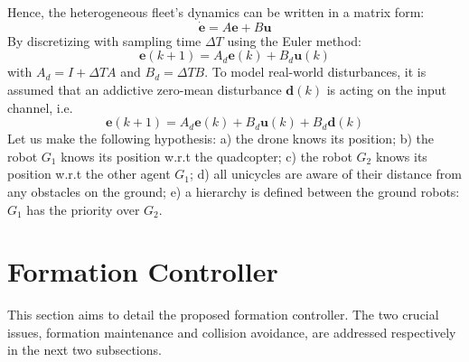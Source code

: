\documentclass{ifacconf}
\begin{document}
Hence, the heterogeneous fleet's dynamics can be written in a matrix form:
\begin{equation}
    \dot{\boldsymbol{e}} = A \boldsymbol{e} + B \boldsymbol{u}
\end{equation}
By discretizing with sampling time $\Delta T$ using the Euler method:
\begin{equation}
    \boldsymbol{e}(k+1) = A_d \boldsymbol{e}(k) + B_d \boldsymbol{u}(k) 
    \label{eq:airground-fleet-z}
\end{equation}
with $A_d = I + \Delta T A $ and $B_d = \Delta T B$.
To model real-world disturbances, it is assumed 
that an addictive zero-mean disturbance $\boldsymbol{d}(k)$
is acting on the input channel, i.e.
\begin{equation}
    \boldsymbol{e}(k+1) = A_d \boldsymbol{e}(k) + B_d \boldsymbol{u}(k) + B_d \boldsymbol{d}(k)
    \label{eq:airground-fleet-z}
\end{equation}
Let us make the following hypothesis: 
a) the drone knows its position;
b) the robot $G_1$ knows its position w.r.t the quadcopter;
c) the robot $G_2$ knows its position w.r.t the other agent $G_1$;
d) all unicycles are aware of their distance from any obstacles on the ground;
e) a hierarchy is defined between the ground robots: $G_1$ has the priority over $G_2$.
\section{Formation Controller}
\label{sec:formation_controller}

This section aims to detail the proposed formation controller.
The two crucial issues, formation maintenance and collision avoidance, 
are addressed respectively in the next two subsections.
\end{document}
